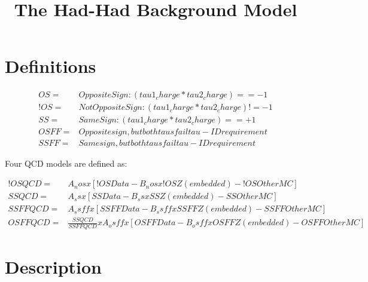 \documentclass{article}
\title{The Had-Had Background Model}
\begin{document}
\maketitle


\section{Definitions}

\begin{eqnarray*}
OS =& Opposite Sign: (tau1_charge * tau2_charge) == -1 \\
!OS =& Not Opposite Sign: (tau1_charge * tau2_charge) != -1 \\
SS =& Same Sign: (tau1_charge * tau2_charge) == +1 \\
OSFF =& Opposite sign, but both taus fail tau-ID requirement \\
SSFF =& Same sign, but both taus fail tau-ID requirement
\end{eqnarray*}

Four QCD models are defined as:

\begin{eqnarray*}
!OS QCD =& A_nos x [!OS Data - B_nos x !OS Z (embedded) - !OS Other MC] \\
SS QCD =& A_ss x [SS Data - B_ss x SS Z (embedded) - SS Other MC] \\
SSFF QCD =& A_ssff x [SSFF Data - B_ssff x SSFF Z (embedded) - SSFF Other MC] \\
OSFF QCD =& \frac{SS QCD}{SSFF QCD} x A_osff x [OSFF Data - B_osff x OSFF Z (embedded) - OSFF Other MC]
\end{eqnarray*}

\section{Description}
\end{document}
